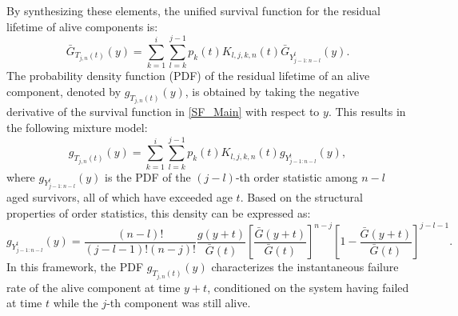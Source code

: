 \documentclass[twoside]{article}
\begin{document}
By synthesizing these elements, the unified survival function for the residual lifetime of alive components is:
\begin{equation}\label{SF_Main}
\bar{G}_{T_{j,n}(t)}(y) = \sum\limits_{k=1}^{i} \sum\limits_{l=k}^{j-1} p_k(t) K_{l,j,k,n}(t) \bar{G}_{Y^t_{j-1:n-l}}(y).
\end{equation}
The probability density function (PDF) of the residual lifetime of an alive component, denoted by $g_{T_{j,n}(t)}(y)$, is obtained by taking the negative derivative of the survival function in \eqref{SF_Main} with respect to $y$. This results in the following mixture model:
\begin{equation}\label{PDF_Main}
g_{T_{j,n}(t)}(y) = \sum\limits_{k=1}^{i} \sum\limits_{l=k}^{j-1} p_k(t) K_{l,j,k,n}(t) g_{Y^t_{j-1:n-l}}(y),
\end{equation}
where $g_{Y^t_{j-1:n-l}}(y)$ is the PDF of the $(j-l)$-th order statistic among $n-l$ aged survivors, all of which have exceeded age $t$. Based on the structural properties of order statistics, this density can be expressed as:
\begin{equation}
g_{Y^t_{j-1:n-l}}(y) = \frac{(n-l)!}{(j-l-1)!(n-j)!} \frac{g(y+t)}{\bar{G}(t)} \left[ \frac{\bar{G}(y+t)}{\bar{G}(t)} \right]^{n-j} \left[ 1 - \frac{\bar{G}(y+t)}{\bar{G}(t)} \right]^{j-l-1}.
\end{equation}
In this framework, the PDF $g_{T_{j,n}(t)}(y)$ characterizes the instantaneous failure rate of the alive component at time $y+t$, conditioned on the system having failed at time $t$ while the $j$-th component was still alive.
\end{document}
